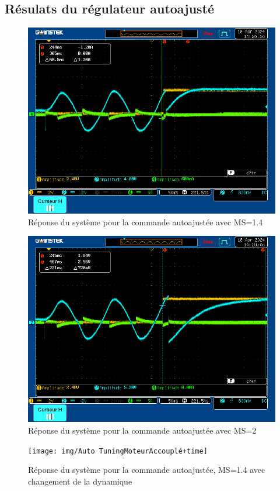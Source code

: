 \subsection{Résulats du régulateur autoajusté}
\begin{figure}[h]
	\centering
	\includegraphics[width=0.8\linewidth]{img/RepMS1,4TRegPID}
	\caption{Réponse du système pour la commande autoajustée avec MS=1.4}
	\label{fig:Réponse du système pour la commande autoajustée avec MS=1.4}
\end{figure}
\begin{figure}[h]
	\centering
	\includegraphics[width=0.8\linewidth]{img/RepMS2TRegPID}
	\caption{Réponse du système pour la commande autoajustée avec MS=2}
	\label{fig:Réponse du système pour la commande autoajustée avec MS=2}
\end{figure}
\begin{figure}[h]
	\centering
	\texttt{[image: img/Auto TuningMoteurAccouplé+time]}
	\caption{Réponse du système pour la commande autoajustée, MS=1.4 avec changement de la dynamique}
	\label{fig:Réponse du système pour la commande autoajustée, MS=1.4 avec changement de la dynamique}
\end{figure}

